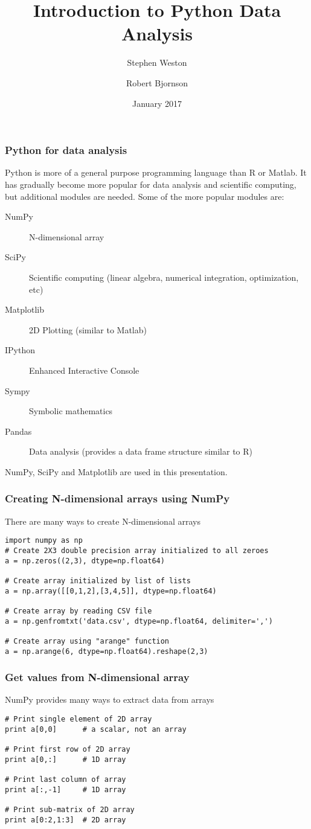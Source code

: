 \documentclass[10pt]{beamer}
\title{Introduction to Python Data Analysis}
\author{{Stephen Weston} \and {Robert Bjornson}}
\institute[Yale]{
  Yale Center for Research Computing \\
  Yale University
}
\date{January 2017}
\begin{document}
\begin{frame}[plain]
  \titlepage
\end{frame}

\begin{frame}
\frametitle{Python for data analysis}
Python is more of a general purpose programming language than
R or Matlab.
It has gradually become more popular for data analysis and
scientific computing, but additional modules are needed.
Some of the more popular modules are:
\begin{description}
\item[NumPy] N-dimensional array
\item[SciPy] Scientific computing (linear algebra, numerical integration, optimization, etc)
\item[Matplotlib] 2D Plotting (similar to Matlab)
\item[IPython] Enhanced Interactive Console
\item[Sympy] Symbolic mathematics
\item[Pandas] Data analysis (provides a data frame structure similar to R)
\end{description}
\vskip10pt
NumPy, SciPy and Matplotlib are used in this presentation.
\end{frame}

\begin{frame}[fragile]
\frametitle{Creating N-dimensional arrays using NumPy}
There are many ways to create N-dimensional arrays
\begin{verbatim}
import numpy as np
# Create 2X3 double precision array initialized to all zeroes
a = np.zeros((2,3), dtype=np.float64)

# Create array initialized by list of lists
a = np.array([[0,1,2],[3,4,5]], dtype=np.float64)

# Create array by reading CSV file
a = np.genfromtxt('data.csv', dtype=np.float64, delimiter=',')

# Create array using "arange" function
a = np.arange(6, dtype=np.float64).reshape(2,3)
\end{verbatim}
\end{frame}

\begin{frame}[fragile]
\frametitle{Get values from N-dimensional array}
NumPy provides many ways to extract data from arrays
\begin{verbatim}
# Print single element of 2D array
print a[0,0]      # a scalar, not an array

# Print first row of 2D array
print a[0,:]      # 1D array

# Print last column of array
print a[:,-1]     # 1D array

# Print sub-matrix of 2D array
print a[0:2,1:3]  # 2D array

\end{verbatim}
\end{frame}
\end{document}
